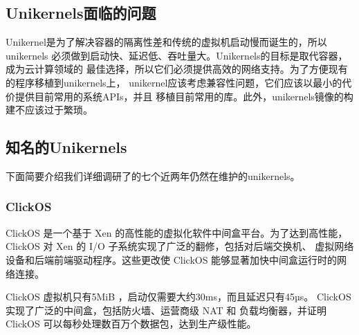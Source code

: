 \documentclass{../runikraft-report}
\begin{document}
\subsection{Unikernels面临的问题}
Unikernel是为了解决容器的隔离性差和传统的虚拟机启动慢而诞生的，所以unikernels
必须做到启动快、延迟低、吞吐量大。Unikernels的目标是取代容器，成为云计算领域的
最佳选择，所以它们必须提供高效的网络支持。为了方便现有的程序移植到unikernels上，
unikernel应该考虑兼容性问题，它们应该以最小的代价提供目前常用的系统APIs，并且
移植目前常用的库。此外，unikernels镜像的构建不应该过于繁琐。

\subsection{知名的Unikernels}\label{subsec:famous-unikernel-projects}
下面简要介绍我们详细调研了的七个近两年仍然在维护的unikernels。

\subsubsection{ClickOS}

ClickOS 是一个基于 Xen 的高性能的虚拟化软件中间盒平台。为了达到高性能，
ClickOS 对 Xen 的 I/O 子系统实现了广泛的翻修，包括对后端交换机、
虚拟网络设备和后端前端驱动程序。这些更改使 ClickOS 能够显著加快中间盒运行时的网络连接。\cite{bib:12-clickos}

ClickOS 虚拟机只有5MiB ，启动仅需要大约30ms，而且延迟只有45µs。
ClickOS 实现了广泛的中间盒，包括防火墙、运营商级 NAT 和
负载均衡器，并证明 ClickOS 可以每秒处理数百万个数据包，达到生产级性能。\cite{bib:12-clickos}\cite{bib:13-clickos2}
\end{document}
